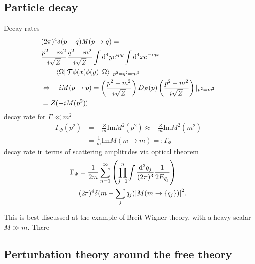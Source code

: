 \subsection{Particle decay}
\begin{mybox}{Decay rates}
	\begin{align}
		&(2 \pi)^4 \delta(p-q) M(p\rightarrow q) =\\
		&\frac{p^2-m^2}{i \sqrt{Z}} \frac{q^2-m^2}{i \sqrt{Z}} \int \mathrm{d}^4 y e^{ipy} \int \mathrm{d}^4 x e^{-iqx}\\
		&\qquad \bra{\Omega}\mathcal{T}\phi(x) \phi(y) \ket{\Omega} |_{p^2=q^2=m^2}\nonumber \\
		&\Leftrightarrow\quad i M(p\rightarrow p) = \left(\frac{p^2-m^2}{i\sqrt{Z}}\right) D_F(p) \left(\frac{p^2-m^2}{i\sqrt{Z}}\right) |_{p^2=m^2} \\
		&=Z(-iM(p^2)) 
	\end{align}
	decay rate for $\Gamma \ll m^2$
	\begin{align}
	\Gamma_\Phi(p^2) &= -\frac{Z}{m} \mathrm{Im}M^2(p^2) \approx - \frac{Z}{m} \mathrm{Im}M^2(m^2)\\
	& = \frac{1}{m} \mathrm{Im}M(m\rightarrow m) =: \Gamma_\Phi\nonumber
	\end{align}
	decay rate in terms of scattering amplitudes via optical theorem
	\begin{align}
		\label{eq:decayrate}
		\Gamma_\Phi &= \frac{1}{2m} \sum_{n=1}^{\infty} \left(\prod_{j=1}^{n} \int \frac{\mathrm{d}^3 q_j}{(2 \pi)^3} \frac{1}{2 E_{\vec{q}_j}}\right) \\
		&(2\pi)^4 \delta(m-\sum_j q_j) \abs{M(m\rightarrow\{q_j\} )}^2.
	\end{align}
\end{mybox}
This is best discussed at the example of Breit-Wigner theory, with a heavy scalar $M\gg m$. There 



\subsection{Perturbation theory around the free theory}
